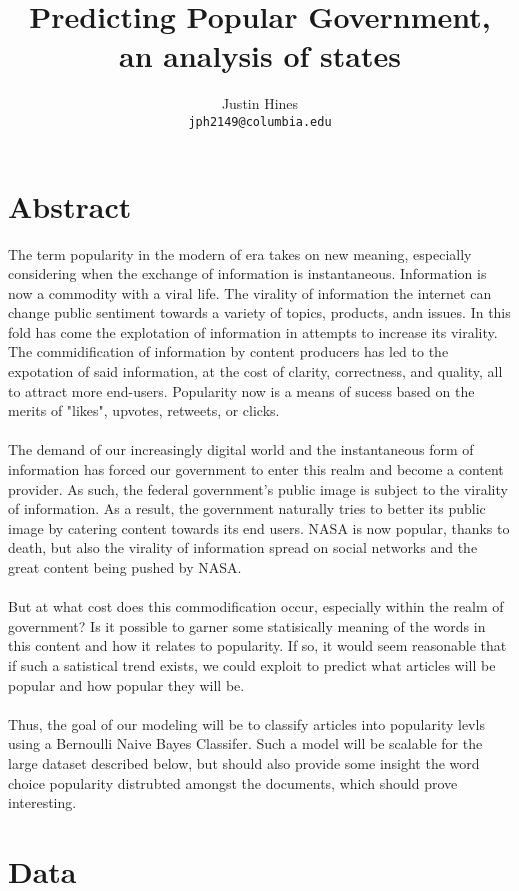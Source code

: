\documentclass[11pt]{article}
\title{Predicting Popular Government, an analysis of states}
\author{Justin Hines\\
{\tt jph2149@columbia.edu}
}
\begin{document}
\maketile

\section{Abstract}

The term popularity in the modern of era takes on new meaning, especially 
considering when the exchange of information is instantaneous.  Information is
now a commodity with a viral life. The virality of 
information the internet can change public sentiment towards a variety of 
topics, products, andn issues.  In this fold has come the explotation of 
information in attempts to increase its virality. The commidification
of information by content producers has led to the expotation of said 
information, at the cost of clarity, correctness, and quality, all to attract
more end-users.  Popularity now is a means of sucess based on the merits of 
"likes", upvotes, retweets, or clicks.  \\
\\
The demand of our increasingly digital world and the instantaneous form of 
information has forced our government to enter this realm and become a content 
provider.  As such, the federal government's public image is subject to the 
virality of information. As a result, the government naturally tries to better
its public image by catering content towards its end users.  NASA is now 
popular, thanks to death, but also the virality of information spread on social
networks and the great content being pushed by NASA. \\
\\
But at what cost does this commodification occur, especially within the realm 
of government? Is it possible to garner some statisically meaning of the words 
in this content and how it relates to popularity.  If so, it would seem 
reasonable that if such a satistical trend exists, we could exploit to predict
what articles will be popular and how popular they will be.\\
\\
Thus, the goal of our modeling will be to classify articles into popularity 
levls using a Bernoulli Naive Bayes Classifer.  Such a model will be scalable
for the large dataset described below, but should also provide some insight
the word choice popularity distrubted amongst the documents, which should
prove interesting.
\section {Data}
\end{document}
